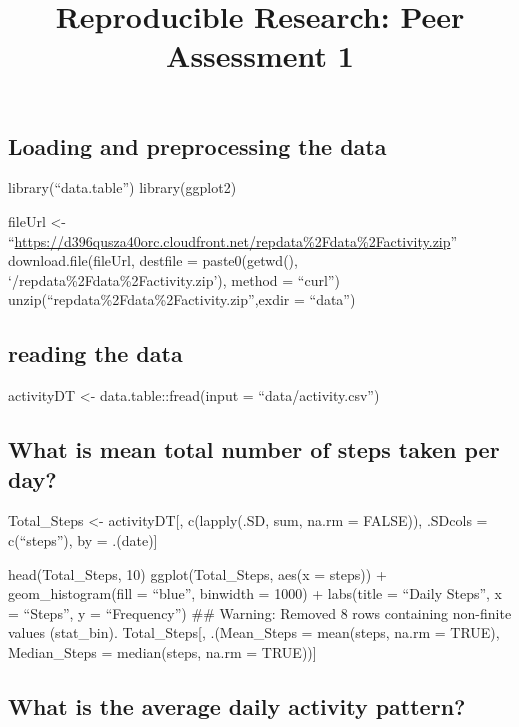 \documentclass[]{article}
\title{Reproducible Research: Peer Assessment 1}
\author{}
\date{\vspace{-2.5em}}
\begin{document}
\maketitle

\hypertarget{loading-and-preprocessing-the-data}{%
\subsection{Loading and preprocessing the
data}\label{loading-and-preprocessing-the-data}}

library(``data.table'') library(ggplot2)

fileUrl \textless{}-
``\url{https://d396qusza40orc.cloudfront.net/repdata\%2Fdata\%2Factivity.zip}''
download.file(fileUrl, destfile = paste0(getwd(),
`/repdata\%2Fdata\%2Factivity.zip'), method = ``curl'')
unzip(``repdata\%2Fdata\%2Factivity.zip'',exdir = ``data'')

\hypertarget{reading-the-data}{%
\subsection{reading the data}\label{reading-the-data}}

activityDT \textless{}- data.table::fread(input = ``data/activity.csv'')

\hypertarget{what-is-mean-total-number-of-steps-taken-per-day}{%
\subsection{What is mean total number of steps taken per
day?}\label{what-is-mean-total-number-of-steps-taken-per-day}}

Total\_Steps \textless{}- activityDT{[}, c(lapply(.SD, sum, na.rm =
FALSE)), .SDcols = c(``steps''), by = .(date){]}

head(Total\_Steps, 10) ggplot(Total\_Steps, aes(x = steps)) +
geom\_histogram(fill = ``blue'', binwidth = 1000) + labs(title = ``Daily
Steps'', x = ``Steps'', y = ``Frequency'') \#\# Warning: Removed 8 rows
containing non-finite values (stat\_bin). Total\_Steps{[}, .(Mean\_Steps
= mean(steps, na.rm = TRUE), Median\_Steps = median(steps, na.rm =
TRUE)){]}

\hypertarget{what-is-the-average-daily-activity-pattern}{%
\subsection{What is the average daily activity
pattern?}\label{what-is-the-average-daily-activity-pattern}}
\end{document}
